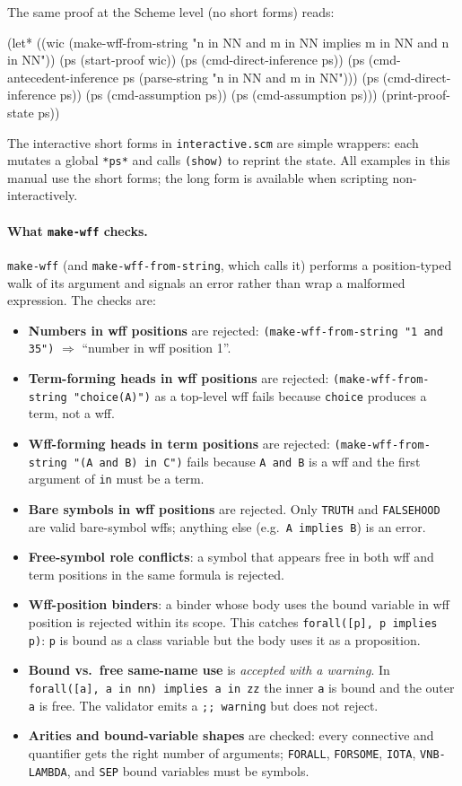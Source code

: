 \documentclass{amsbook}[openany]
\theoremstyle{definition}
\theoremstyle{remark}
\theoremstyle{remark}
\begin{document}
The same proof at the Scheme level (no short forms) reads:
\begin{VNBsnip}
(let* ((wic (make-wff-from-string
              "n in NN and m in NN implies m in NN and n in NN"))
       (ps  (start-proof wic))
       (ps  (cmd-direct-inference ps))
       (ps  (cmd-antecedent-inference ps (parse-string "n in NN and m in NN")))
       (ps  (cmd-direct-inference ps))
       (ps  (cmd-assumption ps))
       (ps  (cmd-assumption ps)))
  (print-proof-state ps))
\end{VNBsnip}
The interactive short forms in \texttt{interactive.scm} are simple
wrappers: each mutates a global \texttt{*ps*} and calls \texttt{(show)}
to reprint the state.  All examples in this manual use the short forms;
the long form is available when scripting non-interactively.

\paragraph{What \texttt{make-wff} checks.}
\texttt{make-wff} (and \texttt{make-wff-from-string}, which calls it)
performs a position-typed walk of its argument and signals an error
rather than wrap a malformed expression.  The checks are:
\begin{itemize}[label=$\ast$, leftmargin=1cm]
\item \textbf{Numbers in wff positions} are rejected:
  \texttt{(make-wff-from-string "1 and 35")} $\Rightarrow$ ``number in wff
  position 1''.
\item \textbf{Term-forming heads in wff positions} are rejected:
  \texttt{(make-wff-from-string "choice(A)")} as a top-level wff fails because
  \texttt{choice} produces a term, not a wff.
\item \textbf{Wff-forming heads in term positions} are rejected:
  \texttt{(make-wff-from-string "(A and B) in C")} fails because \texttt{A and B}
  is a wff and the first argument of \texttt{in} must be a term.
\item \textbf{Bare symbols in wff positions} are rejected.  Only
  \texttt{TRUTH} and \texttt{FALSEHOOD} are valid bare-symbol wffs;
  anything else (e.g.\ \texttt{A implies B}) is an error.
\item \textbf{Free-symbol role conflicts}: a symbol that appears free
  in both wff and term positions in the same formula is rejected.
\item \textbf{Wff-position binders}: a binder whose body uses the
  bound variable in wff position is rejected within its scope.  This
  catches \texttt{forall([p], p implies p)}: \texttt{p} is bound as a
  class variable but the body uses it as a proposition.
\item \textbf{Bound vs.\ free same-name use} is \emph{accepted with a
  warning}.  In \texttt{forall([a], a in nn) implies a in zz} the
  inner \texttt{a} is bound and the outer \texttt{a} is free.  The
  validator emits a \texttt{;; warning} but does not reject.
\item \textbf{Arities and bound-variable shapes} are checked: every
  connective and quantifier gets the right number of arguments;
  \texttt{FORALL}, \texttt{FORSOME}, \texttt{IOTA},
  \texttt{VNB-LAMBDA}, and \texttt{SEP} bound variables must be
  symbols.
\end{itemize}
\end{document}
